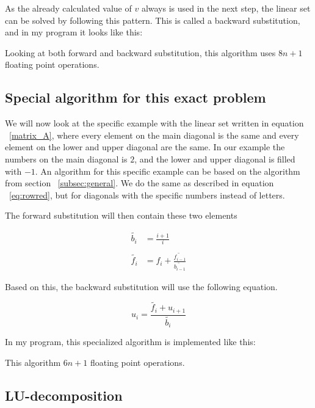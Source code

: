 \documentclass[a4paper,norsk,12pt,oneside]{article}
\begin{document}
As the already calculated value of \(v\) always is used in the next step, the linear set
can be solved by following this pattern. This is called a backward substitution, and in my program
it looks like this: 

 

Looking at both forward and backward substitution, this algorithm uses \(8n + 1\) floating point 
operations. 

\subsection{Special algorithm for this exact problem}

We will now look at the specific example with the linear set written in equation ~\ref{matrix_A}, 
where every element on the main diagonal is the same and every element on the lower and upper diagonal 
are the same. 
In our example the numbers on the main diagonal is \(2\), and the lower and upper diagonal
is filled with \(-1\). An algorithm for this specific example can be based on the algorithm 
from section ~\ref{subsec:general}. We do the same as described in equation ~\ref{eq:rowred}, but 
for diagonals with the specific numbers instead of letters. 

The forward substitution will then contain these two elements

\begin{align*}
    \tilde{b_i} &= \frac{i+1}{i}\\\\
    \tilde{f_i} &= f_i + \frac{\tilde{f_{i-1}}}{\tilde{b_{i-1}}}
\end{align*}

Based on this, the backward substitution will use the following equation. 

\begin{equation*}
    u_i = \frac{\tilde{f_i} + u_{i+1}}{\tilde{b_i}}
\end{equation*} 

In my program, this specialized algorithm is implemented like this:



This algorithm \(6n + 1\) floating point operations.  


\subsection{LU-decomposition}
\end{document}
